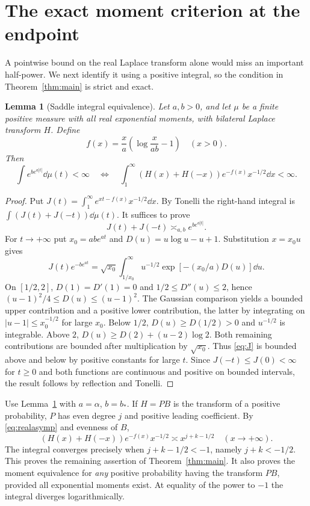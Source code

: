 \documentclass[11pt]{article}
\newtheorem{lemma}[theorem]{Lemma}
\theoremstyle{remark}\newtheorem{remark}[theorem]{Remark}
\begin{document}
\section{The exact moment criterion at the endpoint}
A pointwise bound on the real Laplace transform alone would miss an important half-power. We next identify it using a positive integral, so the condition in Theorem~\ref{thm:main} is strict and exact.

\begin{lemma}[Saddle integral equivalence]\label{lem:saddle}
Let $a,b>0$, and let $\mu$ be a finite positive measure with all real exponential moments, with bilateral Laplace transform $H$. Define
\[
 f(x)=\frac{x}{a}\left(\log\frac{x}{ab}-1\right)\quad(x>0).
\]
Then
\begin{equation}\label{eq:momenttest}
 \int e^{b e^{a|t|}}\dd\mu(t)<\infty
 \quad\Longleftrightarrow\quad
 \int_1^\infty (H(x)+H(-x))e^{-f(x)}x^{-1/2}\dd x<\infty.
\end{equation}
\end{lemma}
\begin{proof}
Put $J(t)=\int_1^\infty e^{xt-f(x)}x^{-1/2}\dd x$. By Tonelli the right-hand integral is $\int(J(t)+J(-t))\dd\mu(t)$. It suffices to prove
\[
 J(t)+J(-t)\asymp_{a,b}e^{b e^{a|t|}}.
\]
For $t\to+\infty$ put $x_0=ab e^{at}$ and $D(u)=u\log u-u+1$. Substitution $x=x_0u$ gives
\begin{equation}\label{eq:J}
 J(t)e^{-b e^{at}}=\sqrt{x_0}\int_{1/x_0}^\infty u^{-1/2}\exp[-(x_0/a)D(u)]\dd u.
\end{equation}
On $[1/2,2]$, $D(1)=D'(1)=0$ and $1/2\le D''(u)\le2$, hence $(u-1)^2/4\le D(u)\le(u-1)^2$. The Gaussian comparison yields a bounded upper contribution and a positive lower contribution, the latter by integrating on $|u-1|\le x_0^{-1/2}$ for large $x_0$. Below $1/2$, $D(u)\ge D(1/2)>0$ and $u^{-1/2}$ is integrable. Above $2$, $D(u)\ge D(2)+(u-2)\log2$. Both remaining contributions are bounded after multiplication by $\sqrt{x_0}$. Thus \eqref{eq:J} is bounded above and below by positive constants for large $t$. Since $J(-t)\le J(0)<\infty$ for $t\ge0$ and both functions are continuous and positive on bounded intervals, the result follows by reflection and Tonelli.
\end{proof}

Use Lemma~\ref{lem:saddle} with $a=\alpha$, $b=b_*$. If $H=PB$ is the transform of a positive probability, $P$ has even degree $j$ and positive leading coefficient. By \eqref{eq:realasymp} and evenness of $B$,
\[
 (H(x)+H(-x))e^{-f(x)}x^{-1/2}\asymp x^{j+k-1/2}\quad(x\to+\infty).
\]
The integral converges precisely when $j+k-1/2<-1$, namely $j+k<-1/2$. This proves the remaining assertion of Theorem~\ref{thm:main}. It also proves the moment equivalence for \emph{any} positive probability having the transform $PB$, provided all exponential moments exist. At equality of the power to $-1$ the integral diverges logarithmically.
\end{document}
